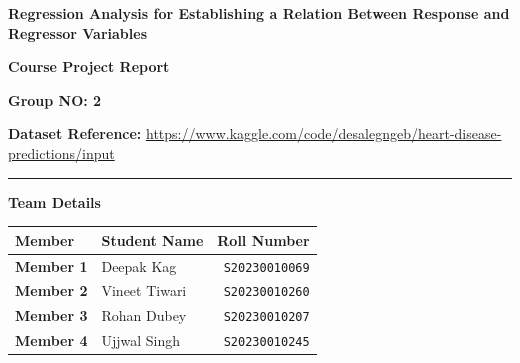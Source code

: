 \documentclass[12pt,a4paper]{article}
\renewcommand{\arraystretch}{1.2}
\begin{document}
\begin{titlepage}
    \centering
    \vspace*{0.2cm}

    {\LARGE \textbf{Regression Analysis for Establishing a Relation Between Response and Regressor Variables}\par}
    \vspace{0.4cm}
    {\Large \textbf{Course Project Report}\par}
    \vspace{0.25cm}
    {\Large \textbf{Group NO: 2}\par}
    \vspace{0.25cm}
    
    {\small \textbf{Dataset Reference:} \url{https://www.kaggle.com/code/desalegngeb/heart-disease-predictions/input}\par}

    \vspace{0.4cm}
    \noindent\rule{\textwidth}{0.8pt}
    \vspace{0.4cm}

    {\Large \textbf{Team Details}}\\[0.3cm]
    \renewcommand{\arraystretch}{1.3}
    \noindent
    \begin{tabularx}{\textwidth}{@{}l L r@{}}
        \toprule
        \textbf{Member} & \textbf{Student Name} & \textbf{Roll Number} \\
        \midrule
        \textbf{Member 1} & Deepak Kag    & \texttt{S20230010069} \\
        \textbf{Member 2} & Vineet Tiwari & \texttt{S20230010260} \\
        \textbf{Member 3} & Rohan Dubey   & \texttt{S20230010207} \\
        \textbf{Member 4} & Ujjwal Singh  & \texttt{S20230010245} \\
        \bottomrule
    \end{tabularx}

    \vfill %


\end{titlepage}
\end{document}
